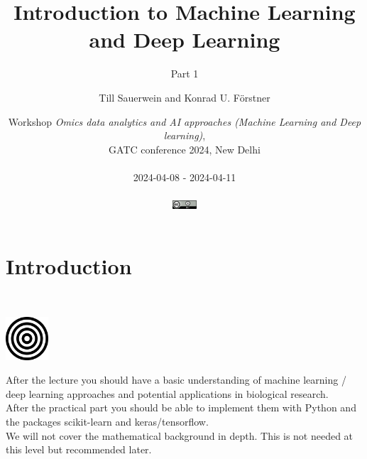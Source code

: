 \documentclass[aspectratio=169]{beamer}
\title{Introduction to Machine Learning and Deep Learning }
\subtitle{Part 1}
\author{\small Till Sauerwein and Konrad U. Förstner}
\institute{ZB MED -- Information Centre for Life Science \& TH Köln}
\date{\scriptsize
  Workshop \textit{Omics data analytics and AI approaches (Machine Learning and Deep learning)},\\
  GATC conference 2024, New Delhi\\ \ \\
  2024-04-08 - 2024-04-11\\\ \\
  \href{https://creativecommons.org/licenses/by/4.0/}{\includegraphics[width=0.88cm]{images/creative_commons_attribute.png}}
}
\begin{document}

\begin{frame}{}
  \titlepage
\end{frame}
\logo{}

\setcounter{tocdepth}{1}
\begin{frame}{}
   \tableofcontents
\end{frame}

\section{Introduction}

\begin{frame}{}
   \tableofcontents[currentsection]
\end{frame}

\begin{frame}
  \begin{block}{}
    \vspace{0.5cm}
    \ \ \ \
    \begin{minipage}{0.10\textwidth}
      \begin{center}
        \includegraphics[width=1.6cm]{images/publicdomainvectors_target-plain.pdf}
      \end{center}        
    \end{minipage}
    \hfill
    \begin{minipage}{0.80\textwidth}
      After the lecture you should have a basic understanding of
      machine learning / deep learning approaches and potential
      applications in biological research.\\

      After the practical part you should be able to implement them
      with Python and the packages scikit-learn and keras/tensorflow.\\

      We will not cover the mathematical background in depth. This is
      not needed at this level but recommended later.
    \end{minipage}
    \vspace{0.3cm}
  \end{block}
\end{frame}
\end{document}

